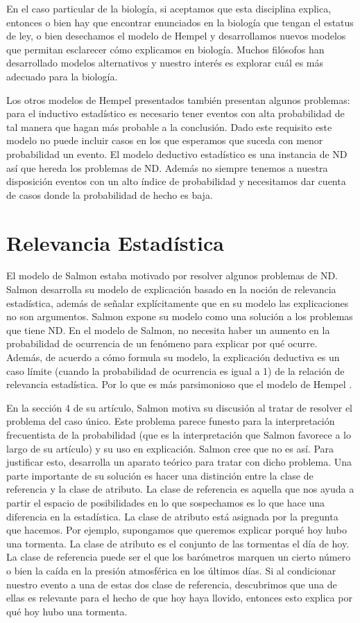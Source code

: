 En el caso particular de la biología, si aceptamos que esta disciplina explica, entonces o bien hay que encontrar enunciados en la biología que tengan el estatus de ley, o bien desechamos el modelo de Hempel y desarrollamos nuevos modelos que permitan esclarecer cómo explicamos en biología. Muchos filósofos han desarrollado modelos alternativos y nuestro interés es explorar cuál es más adecuado para la biología.

Los otros modelos de Hempel presentados también presentan algunos problemas: para el inductivo estadístico es necesario tener eventos con alta probabilidad de tal manera que hagan más probable a la conclusión. Dado este requisito este modelo no puede incluir casos en los que esperamos que suceda con menor probabilidad un evento. El modelo deductivo estadístico es una instancia de ND así que hereda los problemas de ND.  Además no siempre tenemos a nuestra disposición eventos con un alto índice de probabilidad y necesitamos dar cuenta de casos donde la probabilidad de hecho es baja.

\section{Relevancia Estadística}

\noindent El modelo de Salmon estaba motivado por resolver algunos problemas de ND. Salmon desarrolla su modelo de explicación basado en la noción de relevancia estadística, además de señalar explícitamente que en su modelo las explicaciones no son argumentos. Salmon expone su modelo como una solución a los problemas que tiene ND. En el modelo de Salmon, no necesita haber un aumento en la probabilidad de ocurrencia de un fenómeno para explicar por qué ocurre. Además, de acuerdo a cómo formula su modelo, la explicación deductiva es un caso límite (cuando la probabilidad de ocurrencia es igual a 1) de la relación de relevancia estadística. Por lo que es más parsimonioso que el modelo de Hempel \cite{Salmon1970}.

En la sección 4 de su artículo, Salmon motiva su discusión al tratar de resolver el problema del caso único. Este problema parece funesto para la interpretación frecuentista de la probabilidad (que es la interpretación que Salmon favorece a lo largo de su artículo) y su uso en explicación. Salmon cree que no es así. Para justificar esto, desarrolla un aparato teórico para tratar con dicho problema. Una parte importante de su solución es hacer una distinción entre la clase de referencia y la clase de atributo. La clase de referencia es aquella que nos ayuda a partir el espacio de posibilidades en lo que sospechamos es lo que hace una diferencia en la estadística. La clase de atributo está asignada por la pregunta que hacemos. Por ejemplo, supongamos que queremos explicar porqué hoy hubo una tormenta. La clase de atributo es el conjunto de las tormentas el día de hoy. La clase de referencia puede ser el que los barómetros marquen un cierto número o bien la caída en la presión atmosférica en los últimos días. Si al condicionar nuestro evento a una de estas dos clase de referencia, descubrimos que una de ellas es relevante para el hecho de que hoy haya llovido, entonces esto explica por qué hoy hubo una tormenta.

